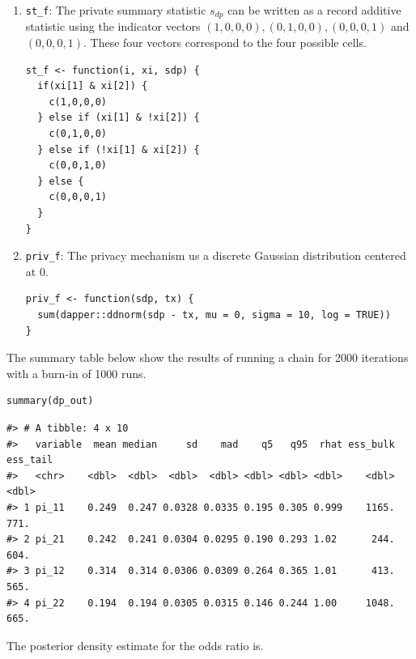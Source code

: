 \begin{enumerate}
\def\labelenumi{\arabic{enumi}.}
\item
  \texttt{st\_f}: The private summary statistic \(s_{dp}\) can be written as a record additive
  statistic using the indicator vectors \((1,0,0,0), (0,1,0,0), (0,0,0,1)\) and \((0,0,0,1)\).
  These four vectors correspond to the four possible cells.

\begin{verbatim}
st_f <- function(i, xi, sdp) {
  if(xi[1] & xi[2]) {
    c(1,0,0,0)
  } else if (xi[1] & !xi[2]) {
    c(0,1,0,0)
  } else if (!xi[1] & xi[2]) {
    c(0,0,1,0)
  } else {
    c(0,0,0,1)
  }
}
\end{verbatim}
\item
  \texttt{priv\_f}: The privacy mechanism us a discrete Gaussian distribution centered
  at 0.

\begin{verbatim}
priv_f <- function(sdp, tx) {
  sum(dapper::ddnorm(sdp - tx, mu = 0, sigma = 10, log = TRUE))
}
\end{verbatim}
\end{enumerate}

The summary table below show the results of running a chain for 2000 iterations with a burn-in of 1000 runs.

\begin{verbatim}
summary(dp_out)
\end{verbatim}

\begin{verbatim}
#> # A tibble: 4 x 10
#>   variable  mean median     sd    mad    q5   q95  rhat ess_bulk ess_tail
#>   <chr>    <dbl>  <dbl>  <dbl>  <dbl> <dbl> <dbl> <dbl>    <dbl>    <dbl>
#> 1 pi_11    0.249  0.247 0.0328 0.0335 0.195 0.305 0.999    1165.     771.
#> 2 pi_21    0.242  0.241 0.0304 0.0295 0.190 0.293 1.02      244.     604.
#> 3 pi_12    0.314  0.314 0.0306 0.0309 0.264 0.365 1.01      413.     565.
#> 4 pi_22    0.194  0.194 0.0305 0.0315 0.146 0.244 1.00     1048.     665.
\end{verbatim}

The posterior density estimate for the odds ratio is.

